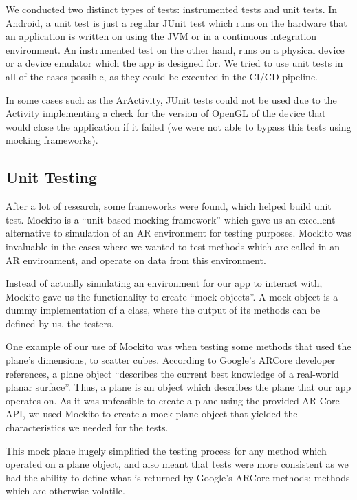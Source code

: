 \documentclass{l3proj}
\begin{document}
We conducted two distinct types of tests: instrumented tests and unit tests. 
In Android, a unit test is just a regular JUnit test which runs on the hardware that an application is 
written on using the JVM or in a continuous integration environment. 
An instrumented test on the other hand, runs on a physical device or a device 
emulator which the app is designed for\cite{AndroidTests}. We tried to use unit 
tests in all of the cases possible, as they could be executed in the CI/CD pipeline. 

In some cases such as the ArActivity, JUnit tests could not be used due to the Activity
implementing a check for the version of OpenGL of the device that would close the
application if it failed (we were not able to bypass this tests using mocking frameworks).

\subsection{Unit Testing}
After a lot of research, some frameworks were found, which helped build unit test.
Mockito is a “unit based mocking framework”\cite{Mockito} which gave us an excellent alternative 
to simulation of an AR environment for testing purposes. Mockito was invaluable in 
the cases where we wanted to test methods which are called in an AR environment, 
and operate on data from this environment.

Instead of actually simulating an environment for our app to interact with, Mockito 
gave us the functionality to create “mock objects”. A mock object is a dummy 
implementation of a class, where the output of its methods can be defined by us, 
the testers.

One example of our use of Mockito was when testing some methods that used the plane's dimensions,
to scatter cubes. According to Google's ARCore developer references, a plane object “describes the 
current best knowledge of a real-world planar surface”\cite{Plane}. Thus, a plane is an object 
which describes the plane that our app operates on. As it was unfeasible to create a plane
using the provided AR Core API, we used Mockito to create a mock plane object
that yielded the characteristics we needed for the tests\cite{MockitoRerence}.

This mock plane hugely simplified the testing process for any method which 
operated on a plane object, and also meant that tests were more consistent as 
we had the ability to define what is returned by Google's ARCore methods; methods 
which are otherwise volatile.
\end{document}
